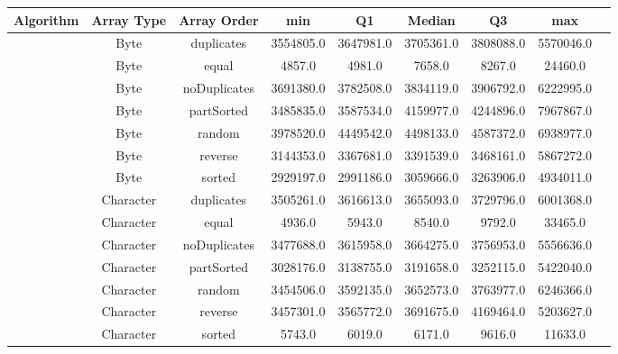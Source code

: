 \documentclass{article}
\begin{document}
\begin{table}[H]
    \centering
    \label{tab:untilnochange_metrics}
    \begin{tabular}{|c|c|c|c|c|c|c|c|c|}
        \toprule
        \textbf{Algorithm} & \textbf{Array Type} & \textbf{Array Order} & \textbf{min} & \textbf{Q1} & \textbf{Median} & \textbf{Q3} & \textbf{max} \\
        \midrule
        & Byte & duplicates & 3554805.0 & 3647981.0 & 3705361.0 & 3808088.0 & 5570046.0 \\
        & Byte & equal & 4857.0 & 4981.0 & 7658.0 & 8267.0 & 24460.0 \\
        & Byte & noDuplicates & 3691380.0 & 3782508.0 & 3834119.0 & 3906792.0 & 6222995.0 \\
        & Byte & partSorted & 3485835.0 & 3587534.0 & 4159977.0 & 4244896.0 & 7967867.0 \\
        & Byte & random & 3978520.0 & 4449542.0 & 4498133.0 & 4587372.0 & 6938977.0 \\
        & Byte & reverse & 3144353.0 & 3367681.0 & 3391539.0 & 3468161.0 & 5867272.0 \\
        & Byte & sorted & 2929197.0 & 2991186.0 & 3059666.0 & 3263906.0 & 4934011.0 \\
        
        & Character & duplicates & 3505261.0 & 3616613.0 & 3655093.0 & 3729796.0 & 6001368.0 \\
        & Character & equal & 4936.0 & 5943.0 & 8540.0 & 9792.0 & 33465.0 \\
        & Character & noDuplicates & 3477688.0 & 3615958.0 & 3664275.0 & 3756953.0 & 5556636.0 \\
        & Character & partSorted & 3028176.0 & 3138755.0 & 3191658.0 & 3252115.0 & 5422040.0 \\
        & Character & random & 3454506.0 & 3592135.0 & 3652573.0 & 3763977.0 & 6246366.0 \\
        & Character & reverse & 3457301.0 & 3565772.0 & 3691675.0 & 4169464.0 & 5203627.0 \\
        & Character & sorted & 5743.0 & 6019.0 & 6171.0 & 9616.0 & 11633.0 \\
        

\end{tabular}
\end{table}
\end{document}
